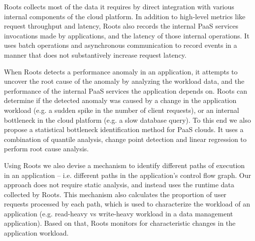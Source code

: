 Roots collects most of the data it requires by direct integration with various internal components 
of the cloud platform. In addition to high-level metrics like request throughput
and latency, Roots also records the internal PaaS services invocations made by applications,
and the latency of those internal operations. It uses batch operations and asynchronous 
communication to record events in a manner that does not substantively
increase request latency.

When Roots detects a performance anomaly in an application, it attempts to uncover the
root cause of the anomaly by analyzing the workload data,
and the performance of the internal PaaS services the application depends on. 
Roots can determine if the detected anomaly was caused by a change in the
application workload (e.g. a sudden spike in the number of client requests), or an internal
bottleneck in the cloud platform (e.g. a slow database query). To this end we also propose
a statistical bottleneck identification method for PaaS clouds. 
It uses a combination of quantile analysis, change point detection
and linear regression to perform root cause analysis. 

Using Roots we also devise a mechanism to identify different paths of execution in
an application -- i.e. different paths in the application's control flow graph. 
Our approach does not require static analysis, and instead uses the 
runtime data collected by Roots. This mechanism also calculates the proportion of 
user requests processed by each path, which is used to characterize the workload
of an application (e.g. read-heavy vs write-heavy workload in a data management
application). Based on that, Roots monitors for characteristic changes in the application
workload.

